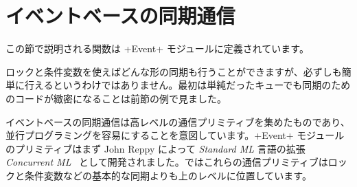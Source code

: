 \section{イベントベースの同期通信}

この節で説明される関数は \ml+Event+ モジュールに定義されています。

ロックと条件変数を使えばどんな形の同期も行うことができますが、必ずしも簡単に行えるというわけではありません。最初は単純だったキューでも同期のためのコードが緻密になることは前節の例で見ました。

イベントベースの同期通信は高レベルの通信プリミティブを集めたものであり、並行プログラミングを容易にすることを意図しています。\ml+Event+ モジュールのプリミティブはまず John Reppy によって \emph{Standard ML} 言語の拡張 \emph{Concurrent ML}~\cite{CML} として開発されました。\ocaml ではこれらの通信プリミティブはロックと条件変数などの基本的な同期よりも上のレベルに位置しています。

